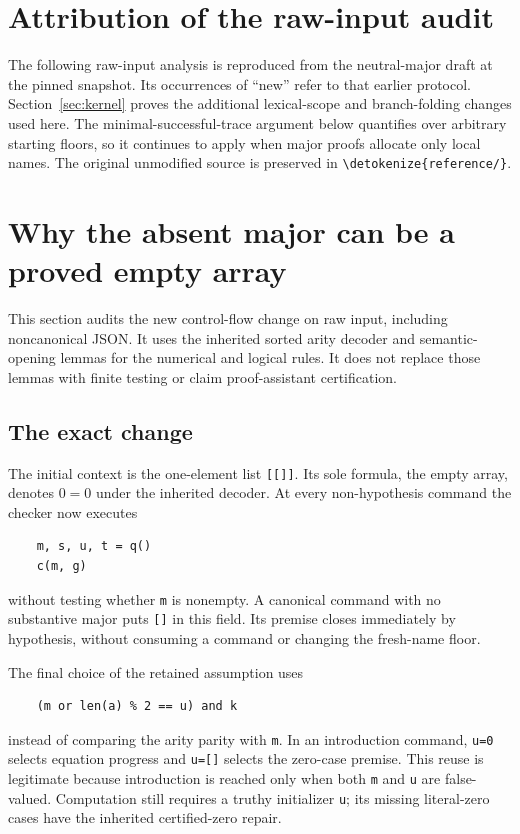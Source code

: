 \documentclass[11pt]{article}
\theoremstyle{definition}\newtheorem{definition}[theorem]{Definition}
\newcommand{\file}[1]{\expandafter\nolinkurl\expandafter{\detokenize{#1}}}
\begin{document}
\section{Attribution of the raw-input audit}
The following raw-input analysis is reproduced from the neutral-major
draft at the pinned snapshot.\cite{neutral} Its occurrences of ``new''
refer to that earlier protocol. Section~\ref{sec:kernel} proves the
additional lexical-scope and branch-folding changes used here. The
minimal-successful-trace argument below quantifies over arbitrary starting
floors, so it continues to apply when major proofs allocate only local
names. The original unmodified source is preserved in \file{reference/}.

\section{Why the absent major can be a proved empty array}
\label{sec:neutral-major-audit}

This section audits the new control-flow change on raw input, including
noncanonical JSON.  It uses the inherited sorted arity decoder and
semantic-opening lemmas for the numerical and logical rules.  It does not
replace those lemmas with finite testing or claim proof-assistant
certification.

\subsection{The exact change}

The initial context is the one-element list \texttt{[[]]}.  Its sole
formula, the empty array, denotes $0=0$ under the inherited decoder.
At every non-hypothesis command the checker now executes
\begin{verbatim}
    m, s, u, t = q()
    c(m, g)
\end{verbatim}
without testing whether \texttt{m} is nonempty.  A canonical command with
no substantive major puts \texttt{[]} in this field.  Its premise closes
immediately by hypothesis, without consuming a command or changing the
fresh-name floor.

The final choice of the retained assumption uses
\begin{verbatim}
    (m or len(a) % 2 == u) and k
\end{verbatim}
instead of comparing the arity parity with \texttt{m}.  In an
introduction command, \texttt{u=0} selects equation progress and
\texttt{u=[]} selects the zero-case premise.  This reuse is legitimate
because introduction is reached only when both \texttt{m} and
\texttt{u} are false-valued.  Computation still requires a truthy
initializer \texttt{u}; its missing literal-zero cases have the
inherited certified-zero repair.
\end{document}
